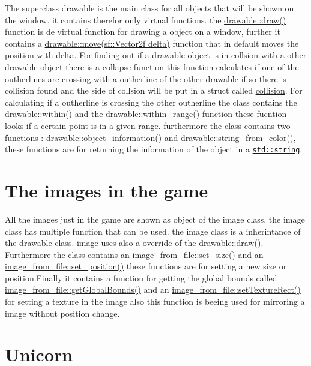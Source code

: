 The superclass drawable is the main class for all objects that will be shown on the window. it contains therefor only virtual functions. the \hyperlink{classdrawable_a4e49e2c1121704c83ce24c5f48dd910f}{drawable\+::draw()} function is de virtual function for drawing a object on a window, further it contains a \hyperlink{classdrawable_ad0d3930c045cc6776aa2c3965be32491}{drawable\+::move(sf\+::\+Vector2f delta)} function that in default moves the position with delta. For finding out if a drawable object is in collsion with a other drawable object there is a collapse function this function calculates if one of the outherlines are crossing with a outherline of the other drawable if so there is collision found and the side of collsion will be put in a struct called \hyperlink{structcollision}{collision}. For calculating if a outherline is crossing the other outherline the class contains the \hyperlink{classdrawable_a0d3278e4e888fc8289468e8893dd8329}{drawable\+::within()} and the \hyperlink{classdrawable_ab5c0e1af885f214bc9ef0da47cdb5ac9}{drawable\+::within\+\_\+range()} function these fucntion looks if a certain point is in a given range. furthermore the class contains two functions \+: \hyperlink{classdrawable_a2ed0f8bb53f33477f7722efa7bb24583}{drawable\+::object\+\_\+information()} and \hyperlink{classdrawable_add3d8569fe2616ae0ed503b19c92c08e}{drawable\+::string\+\_\+from\+\_\+color()}, these functions are for returning the information of the object in a \href{http://www.cplusplus.com/reference/string/string/string/}{\tt std\+::string}.\hypertarget{index_images}{}\section{The images in the game}\label{index_images}
All the images just in the game are shown as object of the image class. the image class has multiple function that can be used. the image class is a inherintance of the drawable class. image uses also a override of the \hyperlink{classdrawable_a4e49e2c1121704c83ce24c5f48dd910f}{drawable\+::draw()}. Furthermore the class contains an \hyperlink{classimage__from__file_a43b0d6b11bf46827308e4e6cb7aa8579}{image\+\_\+from\+\_\+file\+::set\+\_\+size()} and an \hyperlink{classimage__from__file_a868911f8d541af91290fb8dc56435cd2}{image\+\_\+from\+\_\+file\+::set\+\_\+position()} these functions are for setting a new size or position.\+Finally it contains a function for getting the global bounds called \hyperlink{classimage__from__file_a971a591f906fa5c6e85b4e32cfc3d6a0}{image\+\_\+from\+\_\+file\+::get\+Global\+Bounds()} and an \hyperlink{classimage__from__file_a6561a7e8833e4ca84ba5a31e98802757}{image\+\_\+from\+\_\+file\+::set\+Texture\+Rect()} for setting a texture in the image also this function is beeing used for mirroring a image without position change.\hypertarget{index_unicorn}{}\section{Unicorn}\label{index_unicorn}
